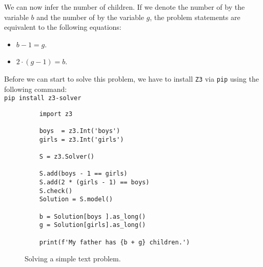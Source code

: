We can now infer the number of children.
If we denote the number of  by the variable $b$ and the number of 
by the variable $g$, the problem statements are equivalent to the following equations:
\begin{itemize}
\item $b - 1 = g$.
\item $2 \cdot (g - 1) = b$.
\end{itemize}
Before we can start to solve this problem, we have to install \texttt{Z3} via \texttt{pip} using the following
command:  
\\[0.2cm]
\hspace*{1.3cm}
\texttt{pip install z3-solver}


\begin{figure}[!ht]
\centering
\begin{verbatim}             
    import z3
    
    boys  = z3.Int('boys')
    girls = z3.Int('girls')
    
    S = z3.Solver()
    
    S.add(boys - 1 == girls)
    S.add(2 * (girls - 1) == boys)
    S.check()
    Solution = S.model()
    
    b = Solution[boys ].as_long()
    g = Solution[girls].as_long()
    
    print(f'My father has {b + g} children.')
\end{verbatim}
\vspace*{-0.3cm}
\caption{Solving a simple text problem.}
\label{fig:Brothers-and-Sisters.ipynb}
\end{figure}

